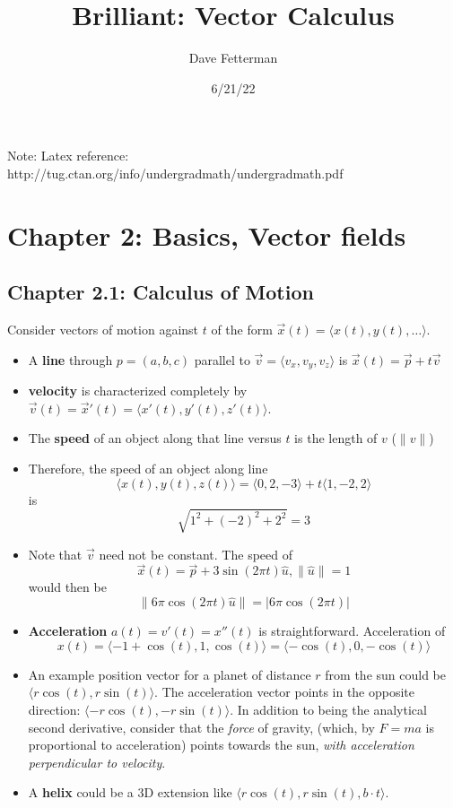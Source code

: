 \documentclass[11pt, oneside]{article}   	%
\title{Brilliant: Vector Calculus}
\author{Dave Fetterman}
\date{6/21/22}							%
\begin{document}
\maketitle
Note: Latex reference: http://tug.ctan.org/info/undergradmath/undergradmath.pdf

\section{Chapter 2: Basics, Vector fields}
\subsection{Chapter 2.1: Calculus of Motion}

Consider vectors of motion against $t$ of the form $ \vec{x}(t) = \langle x(t), y(t), \ldots \rangle$.
\begin{itemize}
\item A \textbf{line} through $p = (a, b, c)$ parallel to $\vec{v} = \langle v_x, v_y, v_z\rangle$ is $\vec{x}(t) = \vec{p} + t \vec{v}$ 
\item \textbf{velocity} is characterized completely by $\vec{v}(t) = \vec{x}'(t) = \langle x'(t), y'(t), z'(t)\rangle$.
\item The \textbf{speed} of an object along that line versus $t$ is the length of $v$ ($\|v\|$)  
\item Therefore, the speed of an object along line 
$$ \langle x(t), y(t), z(t)\rangle = \langle 0, 2, -3\rangle + t\langle 1,-2,2\rangle$$ is $$\sqrt{1^2+(-2)^2 + 2^2} = 3$$
\item Note that $\vec{v}$ need not be constant.  The speed of $$\vec{x}(t) =  \vec{p} + 3 \sin(2\pi t)\hat{u}, \| \hat{u} \| = 1$$ would then be $$\| 6\pi \cos(2 \pi t) \hat{u} \| = |6\pi \cos(2 \pi t)|$$
\item \textbf{Acceleration} $a(t) = v'(t) = x''(t)$ is straightforward.  Acceleration of $$x(t) = \langle -1 + \cos(t), 1, \cos(t)\rangle = \langle -\cos(t), 0, -\cos(t)\rangle$$
\item An example position vector for a planet of distance $r$ from the sun could be $\langle r \cos(t), r \sin(t) \rangle$.  The acceleration vector points in the opposite direction: $\langle - r \cos(t), - r \sin(t) \rangle$.  In addition to being the analytical second derivative, consider that the \emph{force} of gravity, (which, by $F = ma$ is proportional to acceleration) points towards the sun, \emph{with acceleration perpendicular to velocity}.

\item A \textbf{helix} could be a 3D extension like $\langle r \cos(t), r \sin(t), b\cdot t \rangle$.  
\end{itemize}
\end{document}
